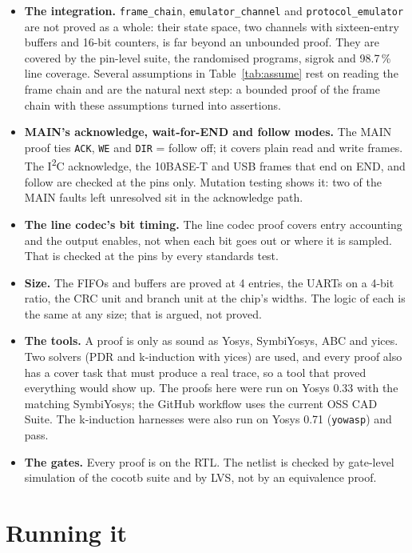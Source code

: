 \documentclass[11pt,a4paper]{article}
\newcommand{\sig}[1]{\texttt{#1}}
\begin{document}
\begin{itemize}
\item \textbf{The integration.} \sig{frame\_chain}, \sig{emulator\_channel} and \sig{protocol\_emulator} are not proved as a whole: their state space, two channels with sixteen-entry buffers and 16-bit counters, is far beyond an unbounded proof. They are covered by the pin-level suite, the randomised programs, sigrok and 98.7\,\% line coverage. Several assumptions in Table~\ref{tab:assume} rest on reading the frame chain and are the natural next step: a bounded proof of the frame chain with these assumptions turned into assertions.
\item \textbf{MAIN's acknowledge, wait-for-END and follow modes.} The MAIN proof ties \sig{ACK}, \sig{WE} and \sig{DIR} = follow off; it covers plain read and write frames. The I\textsuperscript{2}C acknowledge, the 10BASE-T and USB frames that end on END, and follow are checked at the pins only. Mutation testing shows it: two of the MAIN faults left unresolved sit in the acknowledge path.
\item \textbf{The line codec's bit timing.} The line codec proof covers entry accounting and the output enables, not when each bit goes out or where it is sampled. That is checked at the pins by every standards test.
\item \textbf{Size.} The FIFOs and buffers are proved at 4 entries, the UARTs on a 4-bit ratio, the CRC unit and branch unit at the chip's widths. The logic of each is the same at any size; that is argued, not proved.
\item \textbf{The tools.} A proof is only as sound as Yosys, SymbiYosys, ABC and yices. Two solvers (PDR and k-induction with yices) are used, and every proof also has a cover task that must produce a real trace, so a tool that proved everything would show up. The proofs here were run on Yosys 0.33 with the matching SymbiYosys; the GitHub workflow uses the current OSS CAD Suite. The k-induction harnesses were also run on Yosys 0.71 (\sig{yowasp}) and pass.
\item \textbf{The gates.} Every proof is on the RTL. The netlist is checked by gate-level simulation of the cocotb suite and by LVS, not by an equivalence proof.
\end{itemize}

\section{Running it}
\end{document}

